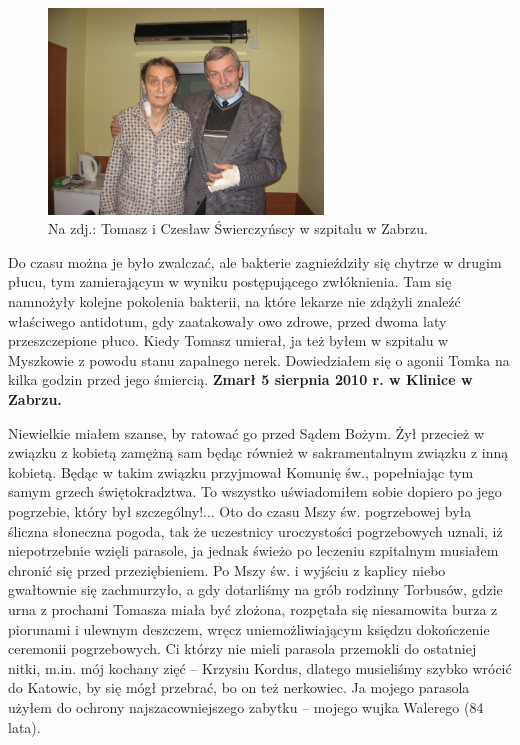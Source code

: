 \begin{figure}[!h]
\begin{center}
\includegraphics[width=0.65\textwidth]{photo/tomasz_swierczynski_szpital.jpg}
\caption[Tomasz Świerczyński w szpitalu]{Na zdj.: Tomasz i Czesław Świerczyńscy w szpitalu w Zabrzu.}
\end{center}
\end{figure}

Do czasu można je było zwalczać, ale bakterie zagnieździły się chytrze w drugim płucu, tym zamierającym w wyniku postępującego zwłóknienia. Tam się namnożyły kolejne pokolenia bakterii, na które lekarze nie zdążyli znaleźć właściwego antidotum, gdy zaatakowały owo zdrowe, przed dwoma laty przeszczepione płuco. Kiedy Tomasz umierał, ja też byłem w szpitalu w Myszkowie z powodu stanu zapalnego nerek. Dowiedziałem się o agonii Tomka na kilka godzin przed jego śmiercią. \textbf{Zmarł 5 sierpnia 2010 r. w Klinice  w Zabrzu.}

Niewielkie miałem szanse, by ratować go przed Sądem Bożym. Żył przecież w związku z kobietą zamężną sam będąc również w sakramentalnym związku z inną kobietą. Będąc w takim związku przyjmował Komunię św., popełniając tym samym grzech świętokradztwa. To wszystko uświadomiłem sobie dopiero po jego pogrzebie, który był szczególny!... Oto do czasu Mszy św. pogrzebowej była śliczna słoneczna pogoda, tak że uczestnicy uroczystości pogrzebowych uznali, iż niepotrzebnie wzięli parasole, ja jednak świeżo po leczeniu szpitalnym musiałem chronić się przed przeziębieniem. Po Mszy św. i wyjściu z kaplicy niebo gwałtownie się zachmurzyło, a gdy dotarliśmy na grób rodzinny Torbusów, gdzie urna z prochami Tomasza miała być złożona, rozpętała się niesamowita burza z piorunami i ulewnym deszczem, wręcz uniemożliwiającym księdzu dokończenie ceremonii pogrzebowych. Ci którzy nie mieli parasola przemokli do ostatniej nitki, m.in. mój kochany zięć – Krzysiu Kordus, dlatego musieliśmy szybko wrócić do Katowic, by się mógł przebrać, bo on też nerkowiec. Ja mojego parasola użyłem do ochrony najszacowniejszego zabytku – mojego wujka Walerego (84 lata).


